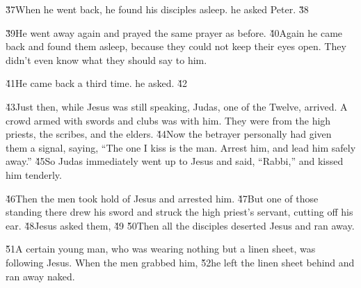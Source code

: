 \v{37}When he went back, he found his disciples asleep.  he asked Peter.  \v{38}

\v{39}He went away again and prayed the same prayer as before. \v{40}Again he came back and found them asleep, because they could not keep their eyes open. They didn't even know what they should say to him.

\v{41}He came back a third time.  he asked.  \v{42}

\v{43}Just then, while Jesus was still speaking, Judas, one of the Twelve, arrived. A crowd armed with swords and clubs was with him. They were from the high priests, the scribes, and the elders. \v{44}Now the betrayer personally had given them a signal, saying, ``The one I kiss is the man. Arrest him, and lead him safely away.'' \v{45}So Judas immediately went up to Jesus and said, ``Rabbi,'' and kissed him tenderly.

\v{46}Then the men took hold of Jesus and arrested him. \v{47}But one of those standing there drew his sword and struck the high priest's servant, cutting off his ear. \v{48}Jesus asked them,  \v{49} \v{50}Then all the disciples deserted Jesus and ran away.

\v{51}A certain young man, who was wearing nothing but a linen sheet, was following Jesus. When the men grabbed him, \v{52}he left the linen sheet behind and ran away naked.

